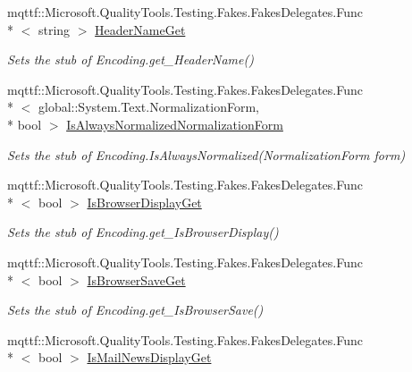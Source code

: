 \begin{DoxyCompactItemize}
mqttf\-::\-Microsoft.\-Quality\-Tools.\-Testing.\-Fakes.\-Fakes\-Delegates.\-Func\\*
$<$ string $>$ \hyperlink{class_system_1_1_text_1_1_fakes_1_1_stub_a_s_c_i_i_encoding_a50d646a3672a54ccae010c2f4309842f}{Header\-Name\-Get}
\begin{DoxyCompactList}\small\item\em Sets the stub of Encoding.\-get\-\_\-\-Header\-Name()\end{DoxyCompactList}\item 
mqttf\-::\-Microsoft.\-Quality\-Tools.\-Testing.\-Fakes.\-Fakes\-Delegates.\-Func\\*
$<$ global\-::\-System.\-Text.\-Normalization\-Form, \\*
bool $>$ \hyperlink{class_system_1_1_text_1_1_fakes_1_1_stub_a_s_c_i_i_encoding_a03348a0dd66f0557eda665b9b89cafa3}{Is\-Always\-Normalized\-Normalization\-Form}
\begin{DoxyCompactList}\small\item\em Sets the stub of Encoding.\-Is\-Always\-Normalized(\-Normalization\-Form form)\end{DoxyCompactList}\item 
mqttf\-::\-Microsoft.\-Quality\-Tools.\-Testing.\-Fakes.\-Fakes\-Delegates.\-Func\\*
$<$ bool $>$ \hyperlink{class_system_1_1_text_1_1_fakes_1_1_stub_a_s_c_i_i_encoding_ab7a2b86f181790af8cb8ce6691b8365d}{Is\-Browser\-Display\-Get}
\begin{DoxyCompactList}\small\item\em Sets the stub of Encoding.\-get\-\_\-\-Is\-Browser\-Display()\end{DoxyCompactList}\item 
mqttf\-::\-Microsoft.\-Quality\-Tools.\-Testing.\-Fakes.\-Fakes\-Delegates.\-Func\\*
$<$ bool $>$ \hyperlink{class_system_1_1_text_1_1_fakes_1_1_stub_a_s_c_i_i_encoding_a2b99d73180781f26d8430c636e5eca8b}{Is\-Browser\-Save\-Get}
\begin{DoxyCompactList}\small\item\em Sets the stub of Encoding.\-get\-\_\-\-Is\-Browser\-Save()\end{DoxyCompactList}\item 
mqttf\-::\-Microsoft.\-Quality\-Tools.\-Testing.\-Fakes.\-Fakes\-Delegates.\-Func\\*
$<$ bool $>$ \hyperlink{class_system_1_1_text_1_1_fakes_1_1_stub_a_s_c_i_i_encoding_a1e0fd9223348c3085ccc82b8fa9364e9}{Is\-Mail\-News\-Display\-Get}

\end{DoxyCompactItemize}
